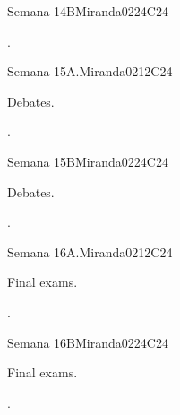 \begin{syllabus}
\begin{unit}{Semana 14B}{}{Miranda02}{24}{C24}
   \begin{learningoutcomes}
      \item . 
      \end{learningoutcomes}
\end{unit}

\begin{unit}{Semana 15A.}{}{Miranda02}{12}{C24}
   \begin{topics}
      \item Debates.
   \end{topics}
   \begin{learningoutcomes}
      \item .
   \end{learningoutcomes}
\end{unit}

\begin{unit}{Semana 15B}{}{Miranda02}{24}{C24}
   \begin{topics}
      \item Debates.
   \end{topics}

   \begin{learningoutcomes}
      \item . 
      \end{learningoutcomes}
\end{unit}

\begin{unit}{Semana 16A.}{}{Miranda02}{12}{C24}
   \begin{topics}
      \item Final exams.
   \end{topics}
   \begin{learningoutcomes}
      \item .
   \end{learningoutcomes}
\end{unit}

\begin{unit}{Semana 16B}{}{Miranda02}{24}{C24}
   \begin{topics}
      \item Final exams.
   \end{topics}

   \begin{learningoutcomes}
      \item . 
      \end{learningoutcomes}
\end{unit}


\begin{coursebibliography}
\end{coursebibliography}

\end{syllabus}
